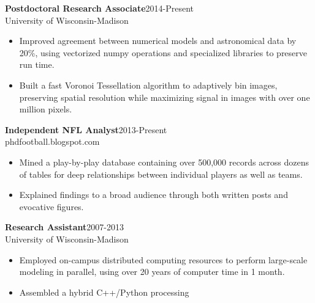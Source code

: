 \documentclass[11pt]{res}
\begin{document}
\begin{resume}
{\bf Postdoctoral Research Associate}\hfill\mbox{2014-Present}\\
University of Wisconsin-Madison
                  \vspace* {0.01 in}\begin{itemize} \itemsep -2pt
                    \item Improved agreement between numerical models
                      and astronomical data by 20\%, using vectorized
                      numpy operations and specialized libraries to
                      preserve run time.
                    \item Built a fast Voronoi Tessellation algorithm
                      to adaptively bin images, preserving spatial
                      resolution while maximizing signal in images
                      with over one million pixels.
                    \end{itemize}
\vspace{-0.15in}
{\bf Independent NFL Analyst}\hfill\mbox{2013-Present}\\
phdfootball.blogspot.com
                  \vspace* {0.01 in}\begin{itemize} \itemsep -2pt
                    \item Mined a play-by-play database containing
                      over 500,000 records across dozens of tables
                      for deep relationships between individual players
                      as well as teams. 
                    \item Explained findings to a broad audience through both written posts and evocative figures.
                  \end{itemize} 
\vspace{-0.15in}
{\bf Research Assistant}\hfill\mbox{2007-2013}\\
University of Wisconsin-Madison
                  \vspace* {0.01 in}\begin{itemize} \itemsep -2pt
                   \item Employed on-campus distributed computing
                     resources to perform large-scale modeling in parallel, using over 20 years of computer time
                     in 1 month.
                   \item Assembled a hybrid C++/Python processing

\end{itemize}
\end{resume}
\end{document}
